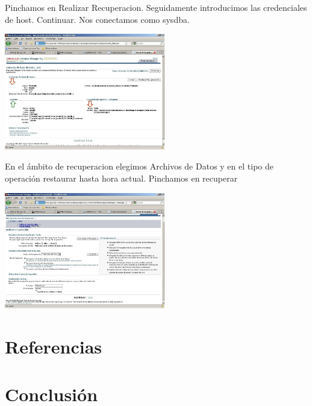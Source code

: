 \documentclass[a4paper,twocolumn,10pt]{article}
\begin{document}
Pinchamos en Realizar Recuperacion. Seguidamente introducimos las credenciales de host. Continuar. Nos conectamos como sysdba.
\begin{center}
\includegraphics[width=7cm]{./Imagenes/eje7.jpg}
\end{center}
En el \'ambito de recuperacion elegimos Archivos de Datos y en el tipo de operaci\'on restaurar hasta hora actual. Pinchamos en recuperar
\begin{center}
\includegraphics[width=7cm]{./Imagenes/eje8.jpg}
\end{center}
      
\section{Referencias}
\section{Conclusi\'on}
\end{document}
